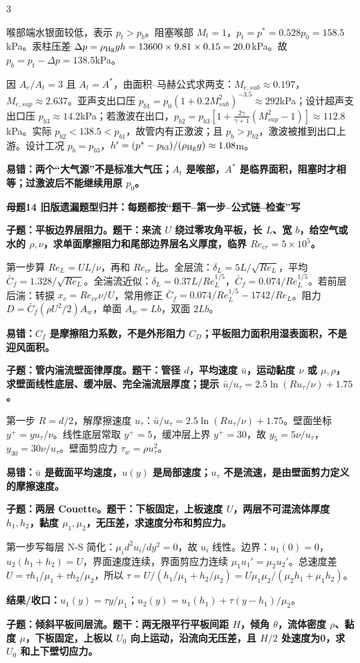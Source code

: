 \documentclass[a4paper]{article}
\newcommand{\mt}[1]{\vspace{0.45pt}\colorbox{M}{\parbox{\dimexpr\linewidth-2\fboxsep}{\color{white}\bfseries #1}}\par}
\newcommand{\qt}[1]{\vspace{0.25pt}\colorbox{Q}{\parbox{\dimexpr\linewidth-2\fboxsep}{\color{white}\bfseries #1}}\par}
\newcommand{\ans}[1]{\colorbox{G}{\parbox{\dimexpr\linewidth-2\fboxsep}{#1}}\par}
\newcommand{\warn}[1]{\colorbox{Y}{\parbox{\dimexpr\linewidth-2\fboxsep}{\color{E}\bfseries #1}}\par}
\newcommand{\res}[1]{{\color{E}\bfseries 结果/收口：}#1\par}
\begin{document}
\begin{multicols}{3}
\ans{喉部端水银面较低，表示 $p_t>p_b$。阻塞喉部 $M_t=1$，$p_t=p^*=0.528p_0=158.5$kPa。汞柱压差 $\Delta p=\rho_{\rm Hg}gh=13600\times9.81\times0.15=20.0$kPa。故 $p_b=p_t-\Delta p=138.5$kPa。}
\ans{因 $A_e/A_t=3$ 且 $A_t=A^*$，由面积--马赫公式求两支：$M_{e,sub}\approx0.197$，$M_{e,sup}\approx2.637$。亚声支出口压 $p_{b1}=p_0(1+0.2M_{sub}^2)^{-3.5}\approx292$kPa；设计超声支出口压 $p_{b3}\approx14.2$kPa；若激波在出口，$p_{b2}=p_{b3}[1+\frac{2\gamma}{\gamma+1}(M_{sup}^2-1)]\approx112.8$kPa。实际 $p_{b2}<138.5<p_{b1}$，故管内有正激波；且 $p_b>p_{b2}$，激波被推到出口上游。设计工况 $p_b=p_{b3}$，$h'=(p^*-p_{b3})/(\rho_{\rm Hg}g)\approx1.08$m。}
\warn{易错：两个“大气源”不是标准大气压；$A_t$ 是喉部，$A^*$ 是临界面积，阻塞时才相等；过激波后不能继续用原 $p_0$。}

\mt{母题14 旧版遗漏题型归并：每题都按“题干--第一步--公式链--检查”写}
\qt{子题：平板边界层阻力。题干：来流 $U$ 绕过零攻角平板，长 $L$、宽 $b$，给空气或水的 $\rho,\nu$，求单面摩擦阻力和尾部边界层名义厚度，临界 $Re_{cr}=5\times10^5$。}
\ans{第一步算 $Re_L=UL/\nu$，再和 $Re_{cr}$ 比。全层流：$\delta_L=5L/\sqrt{Re_L}$，平均 $\bar C_f=1.328/\sqrt{Re_L}$。全湍流近似：$\delta_L=0.37L/Re_L^{1/5}$，$\bar C_f=0.074/Re_L^{1/5}$。若前层后湍：转捩 $x_c=Re_{cr}\nu/U$，常用修正 $\bar C_f=0.074/Re_L^{1/5}-1742/Re_L$。阻力 $D=\bar C_f(\rho U^2/2)A_w$，单面 $A_w=Lb$，双面 $2Lb$。}
\warn{易错：$C_f$ 是摩擦阻力系数，不是外形阻力 $C_D$；平板阻力面积用湿表面积，不是迎风面积。}
\qt{子题：管内湍流壁面律厚度。题干：管径 $d$，平均速度 $\bar u$，运动黏度 $\nu$ 或 $\mu,\rho$，求壁面线性底层、缓冲层、完全湍流层厚度；提示 $\bar u/u_\tau=2.5\ln(Ru_\tau/\nu)+1.75$。}
\ans{第一步 $R=d/2$，解摩擦速度 $u_\tau$：$\bar u/u_\tau=2.5\ln(Ru_\tau/\nu)+1.75$。壁面坐标 $y^+=yu_\tau/\nu$。线性底层常取 $y^+=5$，缓冲层上界 $y^+=30$，故 $y_5=5\nu/u_\tau$，$y_{30}=30\nu/u_\tau$。壁面剪应力 $\tau_w=\rho u_\tau^2$。}
\warn{易错：$\bar u$ 是截面平均速度，$u(y)$ 是局部速度；$u_\tau$ 不是流速，是由壁面剪力定义的摩擦速度。}
\qt{子题：两层 Couette。题干：下板固定，上板速度 $U$，两层不可混流体厚度 $h_1,h_2$，黏度 $\mu_1,\mu_2$，无压差，求速度分布和剪应力。}
\ans{第一步写每层 N-S 简化：$\mu_i d^2u_i/dy^2=0$，故 $u_i$ 线性。边界：$u_1(0)=0$，$u_2(h_1+h_2)=U$，界面速度连续，界面剪应力连续 $\mu_1u_1'=\mu_2u_2'$。总速度差 $U=\tau h_1/\mu_1+\tau h_2/\mu_2$，所以 $\tau=U/(h_1/\mu_1+h_2/\mu_2)=U\mu_1\mu_2/(\mu_2h_1+\mu_1h_2)$。}
\res{$u_1(y)=\tau y/\mu_1$；$u_2(y)=u_1(h_1)+\tau(y-h_1)/\mu_2$。}
\qt{子题：倾斜平板间层流。题干：两无限平行平板间距 $H$，倾角 $\theta$，流体密度 $\rho$、黏度 $\mu$，下板固定，上板以 $U_0$ 向上运动，沿流向无压差，且 $H/2$ 处速度为0，求 $U_0$ 和上下壁切应力。}

\end{multicols}
\end{document}
